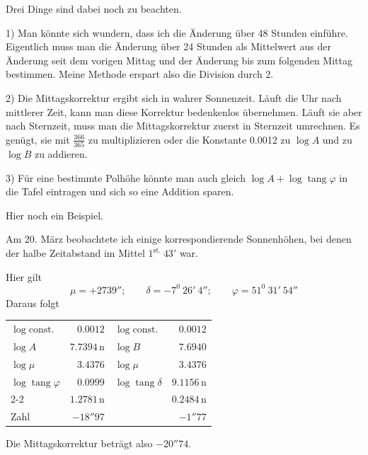 Drei Dinge sind dabei noch zu beachten.

1) Man könnte sich wundern, dass ich die Änderung über 48 Stunden einführe. Eigentlich muss man die Änderung über 24 Stunden als Mittelwert aus der Änderung seit dem vorigen Mittag und der Änderung bis zum folgenden Mittag bestimmen. Meine Methode erspart also die Division durch 2.

2) Die Mittagskorrektur ergibt sich in wahrer Sonnenzeit. Läuft die Uhr nach mittlerer Zeit, kann man diese Korrektur bedenkenlos übernehmen. Läuft sie aber nach Sternzeit, muss man die Mittagskorrektur zuerst in Sternzeit umrechnen. Es genügt, sie mit $\frac{366}{365}$ zu multiplizieren oder die Konstante 0.0012 zu $\log A$ und zu $\log B$ zu addieren.

3) Für eine bestimmte Polhöhe könnte man auch gleich $\log A+\log\operatorname{tang}\varphi$ in die Tafel eintragen und sich so eine Addition sparen.

Hier noch ein Beispiel.

Am 20. März beobachtete ich einige korrespondierende Sonnenhöhen, bei denen der halbe Zeitabstand im Mittel $1^{\mathrm{st.}}\ 43'$ war.
%

Hier gilt
\[
\mu=+2739'';\qquad\delta=-7^0\ 26'\ 4'';\qquad\varphi=51^0\ 31'\ 54''
\]
Daraus folgt
\begin{center}
\begin{tabular}{lr@{\qquad\qquad}lr}
$\log\mathrm{const.}$ & $0.0012$ & $\log\mathrm{const.}$ & $0.0012$\\
$\log A$ & $7.7394\,\mathrm n$ & $\log B$ & $7.6940$\\
$\log\mu$ & $3.4376$ & $\log\mu$ & $3.4376$\\
$\log\operatorname{tang}\varphi$ & $0.0999$ & $\log\operatorname{tang}\delta$ & $9.1156\,\mathrm n$\\\cline{2-2}\cline{4-4}
& $1.2781\,\mathrm n$ & & $0.2484\,\mathrm n$\\
Zahl & $-18''97$ & & $-1''77$\\
\end{tabular}
\end{center}
Die Mittagskorrektur beträgt also $-20''74$.

